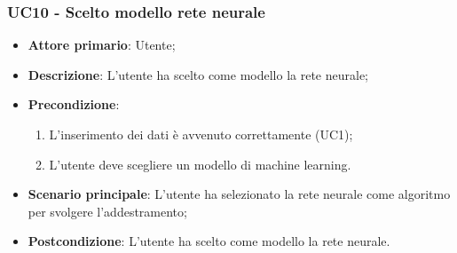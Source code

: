 \subsubsection{UC10 - Scelto modello rete neurale}
\label{sssec:uc10}
\begin{itemize}
  \item \textbf{Attore primario}: Utente;
  \item \textbf{Descrizione}: L'utente ha scelto come modello la rete neurale;
  \item \textbf{Precondizione}:
  \begin{enumerate}
    \item L'inserimento dei dati è avvenuto correttamente (UC1);
    \item L'utente deve scegliere un modello di machine learning.
  \end{enumerate}
  \item \textbf{Scenario principale}: L'utente ha selezionato la rete neurale come algoritmo per svolgere l'addestramento;
  \item \textbf{Postcondizione}: L'utente ha scelto come modello la rete neurale.
\end{itemize}
